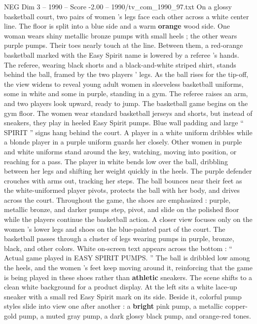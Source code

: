 \begin{textsample}{NEG Dim 3 – 1990 – Score -2.00 – 1990/tv\_com\_1990\_97.txt}  \label{ex:f3_neg_046}
On a glossy basketball court, two pairs of women ’s legs face each other across a white center line.
The floor is split into a blue side and a warm \textbf{orange} wood side.
One woman wears shiny metallic bronze pumps with small heels ; the other wears purple pumps.
Their toes nearly touch at the line.
Between them, a red-orange basketball marked with the Easy Spirit name is lowered by a referee ’s hands.
The referee, wearing black shorts and a black-and-white striped shirt, stands behind the ball, framed by the two players ’ legs.
As the ball rises for the tip-off, the view widens to reveal young adult women in sleeveless basketball uniforms, some in white and some in purple, standing in a gym.
The referee raises an arm, and two players look upward, ready to jump.
The basketball game begins on the gym floor.
The women wear standard basketball jerseys and shorts, but instead of sneakers, they play in heeled Easy Spirit pumps.
Blue wall padding and large “ SPIRIT ” signs hang behind the court.
A player in a white uniform dribbles while a blonde player in a purple uniform guards her closely.
Other women in purple and white uniforms stand around the key, watching, moving into position, or reaching for a pass.
The player in white bends low over the ball, dribbling between her legs and shifting her weight quickly in the heels.
The purple defender crouches with arms out, tracking her steps.
The ball bounces near their feet as the white-uniformed player pivots, protects the ball with her body, and drives across the court.
Throughout the game, the shoes are emphasized : purple, metallic bronze, and darker pumps step, pivot, and slide on the polished floor while the players continue the basketball action.
A closer view focuses only on the women ’s lower legs and shoes on the blue-painted part of the court.
The basketball passes through a cluster of legs wearing pumps in purple, bronze, black, and other colors.
White on-screen text appears across the bottom : “ Actual game played in EASY SPIRIT PUMPS. ” The ball is dribbled low among the heels, and the women ’s feet keep moving around it, reinforcing that the game is being played in these shoes rather than \textbf{athletic} sneakers.
The scene shifts to a clean white background for a product display.
At the left sits a white lace-up sneaker with a small red Easy Spirit mark on its side.
Beside it, colorful pump styles slide into view one after another : a \textbf{bright} pink pump, a metallic copper-gold pump, a muted gray pump, a dark glossy black pump, and orange-red tones.

\end{textsample}
